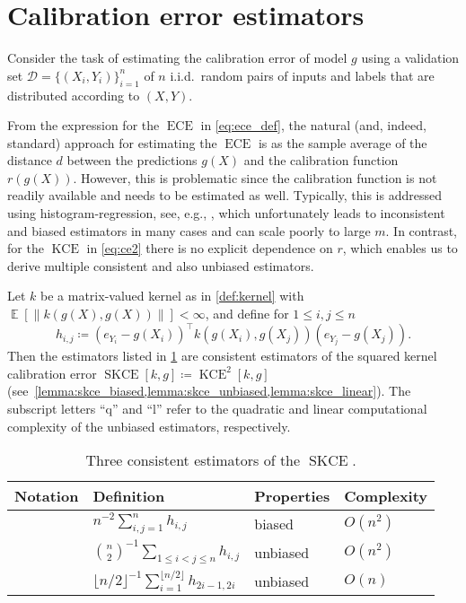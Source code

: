 \documentclass{article}
\DeclareMathOperator{\Expect}{\mathbb{E}}
\DeclareMathOperator{\ECE}{ECE}
\DeclareMathOperator{\kernelmeasure}{KCE}
\DeclareMathOperator{\squaredkernelmeasure}{SKCE}
\DeclareMathOperator{\biasedestimator}{\widehat{SKCE}_b}
\DeclareMathOperator{\unbiasedestimator}{\widehat{SKCE}_{uq}}
\DeclareMathOperator{\linearestimator}{\widehat{SKCE}_{ul}}
\begin{document}
\section{Calibration error estimators}\label{sec:estimators}

Consider the task of estimating the calibration error of model $g$ using a
validation set $\mathcal{D} = \{(X_i, Y_i)\}_{i=1}^n$ of $n$ i.i.d.\ random pairs
of inputs and labels that are distributed according to $(X,Y)$.

From the expression for the $\ECE$ in \cref{eq:ece_def}, the natural (and,
indeed, standard) approach for estimating the $\ECE$ is as the sample
average of the distance $d$ between the predictions $g(X)$ and the
calibration function $r(g(X))$. However, this is problematic since the
calibration function is not readily available and needs to be estimated as
well. Typically, this is addressed using histogram-regression, see, e.g.,
\citet{guo17_calib_moder_neural_networ,naeini15_obtain_bayes,vaicenavicius19_evaluat},
which unfortunately leads to inconsistent and biased estimators in many cases
\citep{vaicenavicius19_evaluat} and can scale poorly to large $m$. In
contrast, for the $\kernelmeasure$ in \cref{eq:ce2} there is no explicit
dependence on $r$, which enables us to derive multiple consistent and also
unbiased estimators.

Let $k$ be a matrix-valued kernel as in \cref{def:kernel} with
$\Expect[\|k(g(X),g(X))\|] < \infty$, and define for $1 \leq i,j \leq n$
\begin{equation*}
  h_{i,j} \coloneqq {(e_{Y_i} - g(X_i))}^\intercal k(g(X_i), g(X_j)) (e_{Y_j} - g(X_j)).
\end{equation*}
Then the estimators listed in \cref{tab:estimators} are consistent estimators of
the squared kernel calibration error
$\squaredkernelmeasure[k, g] \coloneqq \kernelmeasure^2[k,g]$
(see~\cref{lemma:skce_biased,lemma:skce_unbiased,lemma:skce_linear}). The
subscript letters \enquote{q} and \enquote{l} refer to the quadratic and linear
computational complexity of the unbiased estimators, respectively.

\begin{table}[!htbp]
  \begin{center}
    \caption{Three consistent estimators of the $\squaredkernelmeasure$.}
    \label{tab:estimators}
    \begin{tabular}{llll} \toprule
       Notation & Definition & Properties & Complexity\\ \midrule
       $\biasedestimator$ & $n^{-2} \sum_{i,j=1}^n h_{i,j}$ & biased & $O(n^2)$ \\
       $\unbiasedestimator$ & $ {\binom{n}{2}}^{-1} \sum_{1 \leq i < j \leq n} h_{i,j}$ & unbiased & $O(n^2)$ \\
       $\linearestimator$ & $ {\lfloor n/2\rfloor}^{-1} \sum_{i = 1}^{\lfloor n / 2\rfloor} h_{2i-1,2i}$ & unbiased & $O(n)$ \\ \bottomrule
    \end{tabular}
  \end{center}
\end{table}
\end{document}
